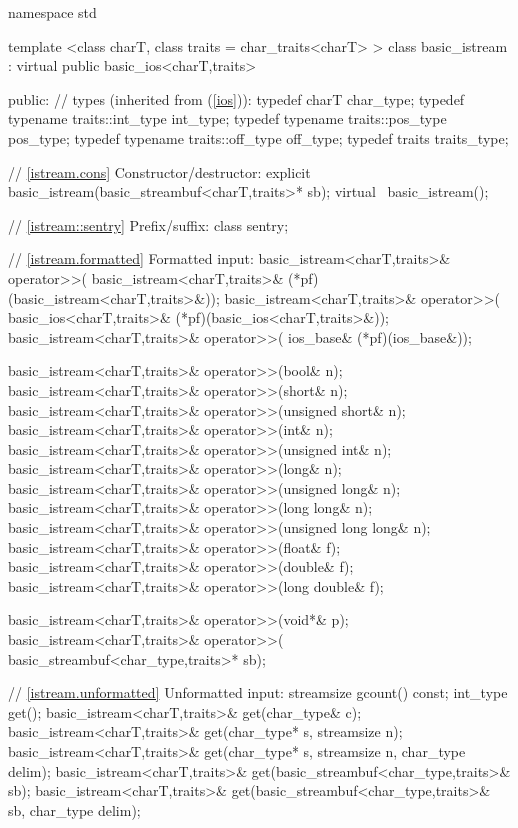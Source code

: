 %
\begin{codeblock}
namespace std {
  template <class charT, class traits = char_traits<charT> >
  class basic_istream : virtual public basic_ios<charT,traits> {
  public:
    // types (inherited from  (\ref{ios})):
    typedef charT                     char_type;
    typedef typename traits::int_type int_type;
    typedef typename traits::pos_type pos_type;
    typedef typename traits::off_type off_type;
    typedef traits                    traits_type;

    // \ref{istream.cons} Constructor/destructor:
    explicit basic_istream(basic_streambuf<charT,traits>* sb);
    virtual ~basic_istream();

    // \ref{istream::sentry} Prefix/suffix:
    class sentry;

    // \ref{istream.formatted} Formatted input:
    basic_istream<charT,traits>& operator>>(
      basic_istream<charT,traits>& (*pf)(basic_istream<charT,traits>&));
    basic_istream<charT,traits>& operator>>(
			basic_ios<charT,traits>& (*pf)(basic_ios<charT,traits>&));
    basic_istream<charT,traits>& operator>>(
      ios_base& (*pf)(ios_base&));

    basic_istream<charT,traits>& operator>>(bool& n);
    basic_istream<charT,traits>& operator>>(short& n);
    basic_istream<charT,traits>& operator>>(unsigned short& n);
    basic_istream<charT,traits>& operator>>(int& n);
    basic_istream<charT,traits>& operator>>(unsigned int& n);
    basic_istream<charT,traits>& operator>>(long& n);
    basic_istream<charT,traits>& operator>>(unsigned long& n);
    basic_istream<charT,traits>& operator>>(long long& n);
    basic_istream<charT,traits>& operator>>(unsigned long long& n);
    basic_istream<charT,traits>& operator>>(float& f);
    basic_istream<charT,traits>& operator>>(double& f);
    basic_istream<charT,traits>& operator>>(long double& f);

    basic_istream<charT,traits>& operator>>(void*& p);
    basic_istream<charT,traits>& operator>>(
      basic_streambuf<char_type,traits>* sb);

    // \ref{istream.unformatted} Unformatted input:
    streamsize gcount() const;
    int_type get();
    basic_istream<charT,traits>& get(char_type& c);
    basic_istream<charT,traits>& get(char_type* s, streamsize n);
    basic_istream<charT,traits>& get(char_type* s, streamsize n,
                                     char_type delim);
    basic_istream<charT,traits>& get(basic_streambuf<char_type,traits>& sb);
    basic_istream<charT,traits>& get(basic_streambuf<char_type,traits>& sb,
                                    char_type delim);

}}
\end{codeblock}
